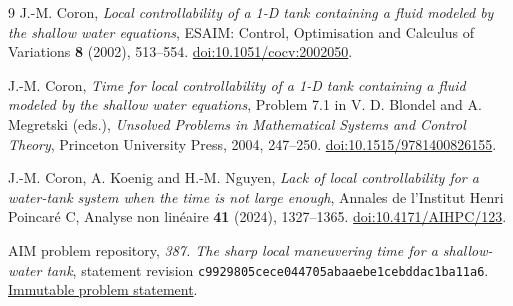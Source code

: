 \documentclass[11pt]{article}
\begin{document}
\begin{thebibliography}{9}
J.-M. Coron, \emph{Local controllability of a 1-D tank containing a fluid
modeled by the shallow water equations}, ESAIM: Control, Optimisation and
Calculus of Variations \textbf{8} (2002), 513--554.
\href{https://doi.org/10.1051/cocv:2002050}{doi:10.1051/cocv:2002050}.

J.-M. Coron, \emph{Time for local controllability of a 1-D tank containing a
fluid modeled by the shallow water equations}, Problem 7.1 in V. D. Blondel
and A. Megretski (eds.), \emph{Unsolved Problems in Mathematical Systems and
Control Theory}, Princeton University Press, 2004, 247--250.
\href{https://doi.org/10.1515/9781400826155}{doi:10.1515/9781400826155}.

J.-M. Coron, A. Koenig and H.-M. Nguyen, \emph{Lack of local controllability
for a water-tank system when the time is not large enough}, Annales de
l'Institut Henri Poincar\'e C, Analyse non lin\'eaire \textbf{41} (2024),
1327--1365. \href{https://doi.org/10.4171/AIHPC/123}{doi:10.4171/AIHPC/123}.

AIM problem repository, \emph{387. The sharp local maneuvering time for a
shallow-water tank}, statement revision
\texttt{c9929805cece044705abaaebe1cebddac1ba11a6}.
\href{https://github.com/MColbrook/AIM/blob/c9929805cece044705abaaebe1cebddac1ba11a6/problems/387-shallow-water-tank-sharp-control-time.md}{Immutable problem statement}.
\end{thebibliography}
\end{document}
